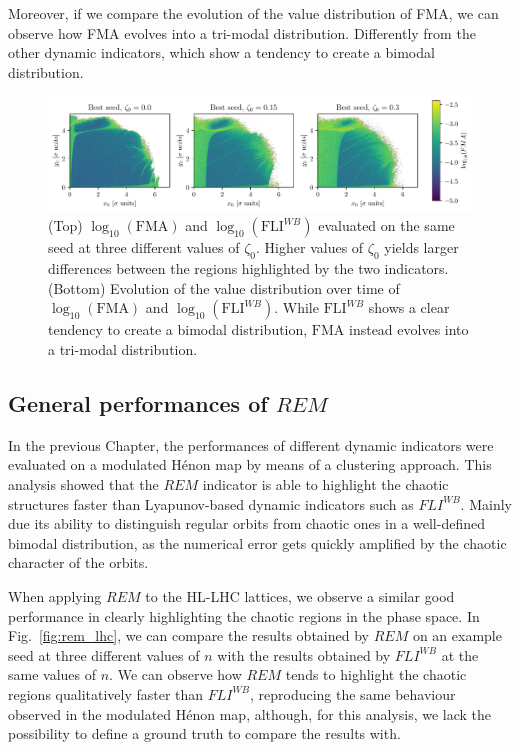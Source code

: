 Moreover, if we compare the evolution of the value distribution of FMA, we can observe how FMA evolves into a tri-modal distribution. Differently from the other dynamic indicators, which show a tendency to create a bimodal distribution.

\begin{figure}[ht]
    \centering
    \includegraphics[width=1.0\textwidth]{6_lhc_dynamic_indicators/figs/FMA.pdf}
    \caption{(Top) $\log_{10}(\mathrm{FMA})$ and $\log_{10}(\mathrm{FLI}^{WB})$ evaluated on the same seed at three different values of $\zeta_0$. Higher values of $\zeta_0$ yields larger differences between the regions highlighted by the two indicators. (Bottom) Evolution of the value distribution over time of $\log_{10}(\mathrm{FMA})$ and $\log_{10}(\mathrm{FLI}^{WB})$. While $\mathrm{FLI}^{WB}$ shows a clear tendency to create a bimodal distribution, $\mathrm{FMA}$ instead evolves into a tri-modal distribution.}
    \label{fig:fma_vs_fli}
\end{figure}

\subsection{General performances of $REM$}

In the previous Chapter, the performances of different dynamic indicators were evaluated on a modulated Hénon map by means of a clustering approach. This analysis showed that the $REM$ indicator is able to highlight the chaotic structures faster than Lyapunov-based dynamic indicators such as $FLI^{WB}$. Mainly due its ability to distinguish regular orbits from chaotic ones in a well-defined bimodal distribution, as the numerical error gets quickly amplified by the chaotic character of the orbits.

When applying $REM$ to the HL-LHC lattices, we observe a similar good performance in clearly highlighting the chaotic regions in the phase space. In Fig.~\ref{fig:rem_lhc}, we can compare the results obtained by $REM$ on an example seed at three different values of $n$ with the results obtained by $FLI^{WB}$ at the same values of $n$. We can observe how $REM$ tends to highlight the chaotic regions qualitatively faster than $FLI^{WB}$, reproducing the same behaviour observed in the modulated Hénon map, although, for this analysis, we lack the possibility to define a ground truth to compare the results with. 

